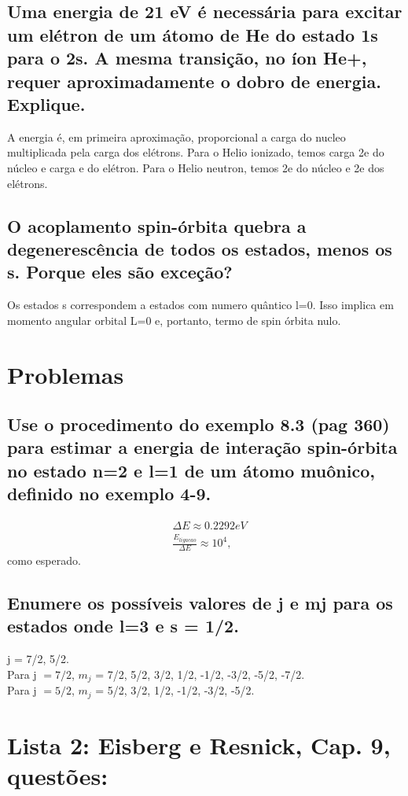 \documentclass{article}
\begin{document}
\subsection{Uma energia de 21 eV é necessária para excitar um elétron de um átomo de He do estado 1s para o 2s. A mesma transição, no íon He+, requer aproximadamente o dobro de energia. Explique.}
A energia é, em primeira aproximação, proporcional a carga do nucleo multiplicada pela carga dos elétrons.
Para o Helio ionizado, temos carga 2e do núcleo e carga e do elétron. Para o Helio neutron, temos 2e do núcleo e 2e dos elétrons.

\subsection{O acoplamento spin-órbita quebra a degenerescência de todos os estados, menos os s. Porque eles são exceção?}
Os estados s correspondem a estados com numero quântico l=0. Isso implica em momento angular orbital L=0 e, portanto, termo de spin órbita nulo.

\section{Problemas}
\subsection{Use o procedimento do exemplo 8.3 (pag 360) para estimar a energia de interação spin-órbita no estado n=2 e l=1 de um átomo muônico, definido no exemplo 4-9.}

\nonumber \begin{align}
    &\Delta E \approx 0.2292 eV \\
    &\frac{E_{ligacao}}{\Delta E} \approx 10^4, 
\end{align}
como esperado.

\subsection{Enumere os possíveis valores de j e mj para os estados onde l=3 e s = 1/2.}

j = 7/2, 5/2.
\[ \]
Para j $ = 7/2$, $m_j$ = 7/2, 5/2, 3/2, 1/2, -1/2, -3/2, -5/2, -7/2.
\[ \]
Para j $ = 5/2$, $m_j$ = 5/2, 3/2, 1/2, -1/2, -3/2, -5/2.

\section{Lista 2: Eisberg e Resnick, Cap. 9, questões:}
\end{document}
